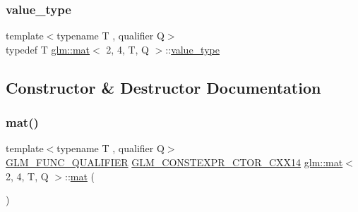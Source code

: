 \mbox{\label{structglm_1_1mat_3_012_00_014_00_01_t_00_01_q_01_4_a837bd82ca90340b03c7ee19f598c5133}} 
\subsubsection{\texorpdfstring{value\+\_\+type}{value\_type}}
{\footnotesize\ttfamily template$<$typename T , qualifier Q$>$ \\
typedef T \hyperlink{structglm_1_1mat}{glm\+::mat}$<$ 2, 4, T, Q $>$\+::\hyperlink{structglm_1_1mat_3_012_00_014_00_01_t_00_01_q_01_4_a837bd82ca90340b03c7ee19f598c5133}{value\+\_\+type}}



\subsection{Constructor \& Destructor Documentation}
\mbox{\label{structglm_1_1mat_3_012_00_014_00_01_t_00_01_q_01_4_a7fc67ba4ee21331632e9da37cec2a96e}} 
\subsubsection{\texorpdfstring{mat()}{mat()}\hspace{0.1cm}{\footnotesize\ttfamily [1/21]}}
{\footnotesize\ttfamily template$<$typename T , qualifier Q$>$ \\
\hyperlink{setup_8hpp_a33fdea6f91c5f834105f7415e2a64407}{G\+L\+M\+\_\+\+F\+U\+N\+C\+\_\+\+Q\+U\+A\+L\+I\+F\+I\+ER} \hyperlink{setup_8hpp_a0900f9145e68bf6061b6f5e7be3fa751}{G\+L\+M\+\_\+\+C\+O\+N\+S\+T\+E\+X\+P\+R\+\_\+\+C\+T\+O\+R\+\_\+\+C\+X\+X14} \hyperlink{structglm_1_1mat}{glm\+::mat}$<$ 2, 4, T, Q $>$\+::\hyperlink{structglm_1_1mat}{mat} (\begin{DoxyParamCaption}{ }\end{DoxyParamCaption})}

\mbox{\label{structglm_1_1mat_3_012_00_014_00_01_t_00_01_q_01_4_a78af7c89ef6af64cc6c24b6764a3099c}} 
